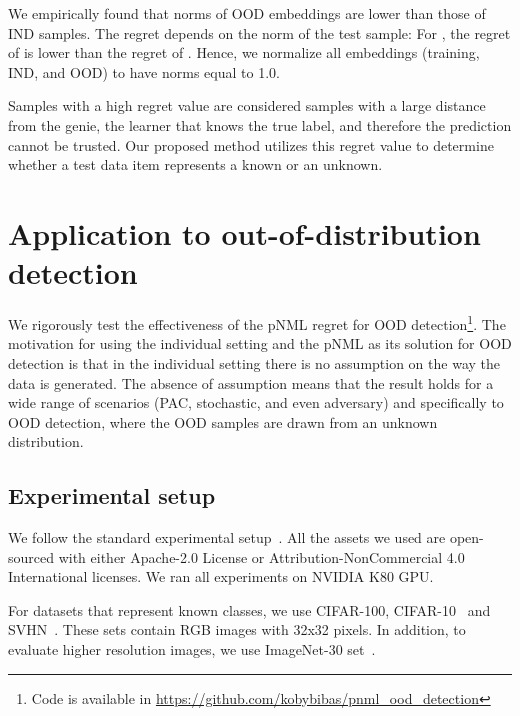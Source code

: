 \documentclass{article}
\newcommand{\minisection}[1]{\vspace{2mm}\noindent{\textbf{#1.}}}
\begin{document}
We empirically found that norms of OOD embeddings are lower than those of IND samples.
The regret depends on the norm of the test sample: For , the regret of  is lower than the regret of .
Hence, we normalize all embeddings (training, IND, and OOD) to have  norms equal to 1.0.

Samples with a high regret value are considered samples with a large distance from the genie, the learner that knows the true label, and therefore the prediction cannot be trusted. Our proposed method utilizes this regret value to determine whether a test data item represents a known or an unknown.





\section{Application to out-of-distribution detection} 
\label{sec:experiments}
We rigorously test the effectiveness of the pNML regret for OOD detection\footnote{Code is available in \url{https://github.com/kobybibas/pnml_ood_detection}}.
The motivation for using the individual setting and the pNML as its solution for OOD detection is that in the individual setting there is no assumption on the way the data is generated. The absence of assumption means that the result holds for a wide range of scenarios (PAC, stochastic, and even adversary) and specifically to OOD detection, where the OOD samples are drawn from an unknown distribution.


\subsection{Experimental setup} 
\label{sec:setup}
We follow the standard experimental setup~\citep{liu2020energy,gram,lee2018simple}.
All the assets we used are open-sourced with either Apache-2.0 License or Attribution-NonCommercial 4.0 International licenses.
We ran all experiments on NVIDIA K80 GPU.

\minisection{IND sets}
For datasets that represent known classes, we use CIFAR-100, CIFAR-10~\citep{krizhevsky2014cifar} and  SVHN~\citep{netzer2011reading}. These sets contain RGB images with 32x32 pixels.
In addition, to evaluate higher resolution images, we use ImageNet-30 set~\citep{DBLP:conf/nips/HendrycksMKS19}.
\end{document}
